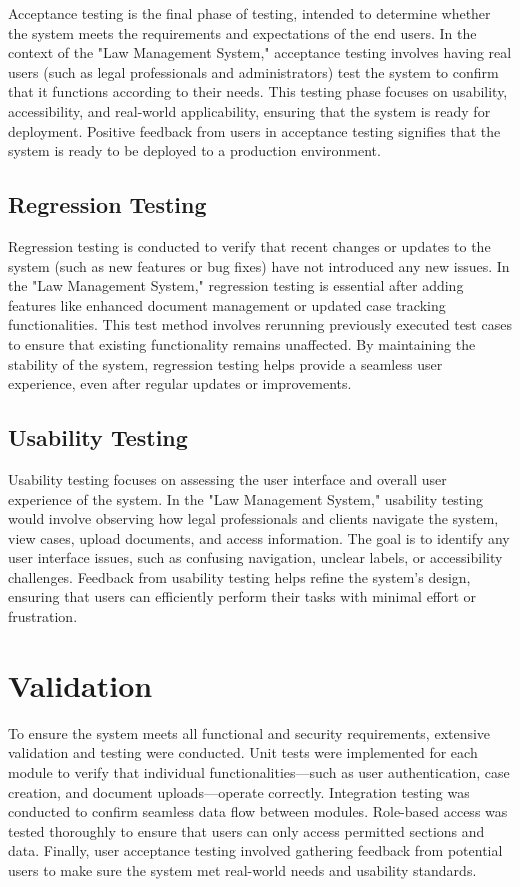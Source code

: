 Acceptance testing is the final phase of testing, intended to determine whether the system meets the requirements and expectations of the end users. In the context of the "Law Management System," acceptance testing involves having real users (such as legal professionals and administrators) test the system to confirm that it functions according to their needs. This testing phase focuses on usability, accessibility, and real-world applicability, ensuring that the system is ready for deployment. Positive feedback from users in acceptance testing signifies that the system is ready to be deployed to a production environment.

\subsection{Regression Testing}

Regression testing is conducted to verify that recent changes or updates to the system (such as new features or bug fixes) have not introduced any new issues. In the "Law Management System," regression testing is essential after adding features like enhanced document management or updated case tracking functionalities. This test method involves rerunning previously executed test cases to ensure that existing functionality remains unaffected. By maintaining the stability of the system, regression testing helps provide a seamless user experience, even after regular updates or improvements.

\subsection{Usability Testing}

Usability testing focuses on assessing the user interface and overall user experience of the system. In the "Law Management System," usability testing would involve observing how legal professionals and clients navigate the system, view cases, upload documents, and access information. The goal is to identify any user interface issues, such as confusing navigation, unclear labels, or accessibility challenges. Feedback from usability testing helps refine the system’s design, ensuring that users can efficiently perform their tasks with minimal effort or frustration.
\section{Validation}
%
To ensure the system meets all functional and security requirements, extensive validation and testing were conducted. Unit tests were implemented for each module to verify that individual functionalities—such as user authentication, case creation, and document uploads—operate correctly. Integration testing was conducted to confirm seamless data flow between modules. Role-based access was tested thoroughly to ensure that users can only access permitted sections and data. Finally, user acceptance testing involved gathering feedback from potential users to make sure the system met real-world needs and usability standards.

